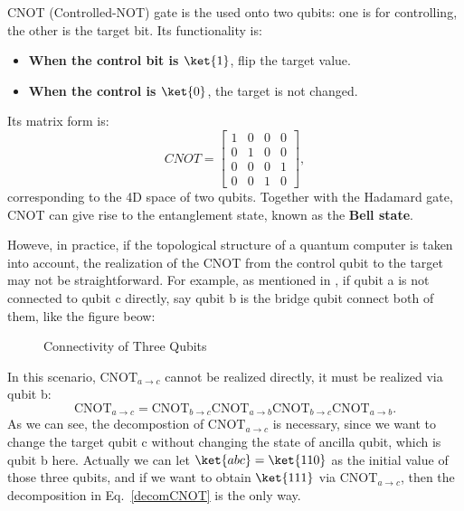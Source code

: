 CNOT (Controlled-NOT) gate is the used onto two qubits: one is for controlling, the other is the target bit. Its functionality is:
\begin{itemize}
    \item \textbf{When the control bit is $\ket{1}$}, flip the target value.
    \item \textbf{When the control is $\ket{0}$}, the target is not changed.
\end{itemize}
Its matrix form is:
\begin{equation}
    CNOT=\begin{bmatrix}
    1&0&0&0\\
    0&1&0&0\\
    0&0&0&1\\
    0&0&1&0
    \end{bmatrix},
\end{equation}
corresponding to the 4D space of two qubits. Together with the Hadamard gate, CNOT can give rise to the entanglement state, known as the \textbf{Bell state}.

Howeve, in practice, if the topological structure of a quantum computer is taken into account, the realization of the CNOT from the control qubit to the target may not be straightforward. For example, as mentioned in \cite{Abhijith2018QuantumBeginner}, if qubit a is not connected to qubit c directly, say qubit b is the bridge qubit connect both of them, like the figure beow:
\begin{figure}[ht]
\centering
{}
\caption{Connectivity of Three Qubits}
\label{fig:linearConnectivity}
\end{figure}
In this scenario, $\text{CNOT}_{a\rightarrow c}$ cannot be realized directly, it must be realized via qubit b:
\begin{equation}
    \text{CNOT}_{a\rightarrow c}=\text{CNOT}_{b\rightarrow c}\text{CNOT}_{a\rightarrow b}\text{CNOT}_{b\rightarrow c}\text{CNOT}_{a\rightarrow b}.
    \label{decomCNOT}
\end{equation}
As we can see, the decompostion of $\text{CNOT}_{a\rightarrow c}$ is necessary, since we want to change the target qubit c without changing the state of ancilla qubit, which is qubit b here. Actually we can let $\ket{abc}=\ket{110}$ as the initial value of those three qubits, and if we want to obtain $\ket{111}$ via $\text{CNOT}_{a\rightarrow c}$, then the decomposition in Eq.~\ref{decomCNOT} is the only way.

